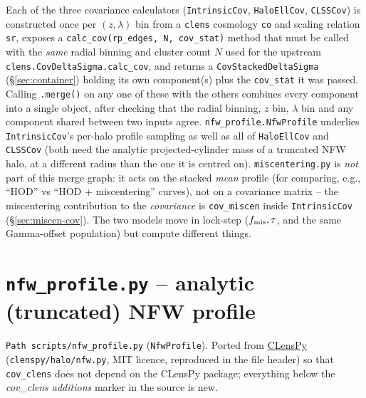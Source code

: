 \documentclass[a4paper, 11pt]{article}
\newcommand{\modname}[1]{\textcolor{kwcol}{\texttt{#1}}}
\newcommand{\blk}[1]{\textcolor{datablockcol}{\texttt{#1}}}
\newcommand{\pyfile}[1]{{\small\texttt{#1}}}
\begin{document}
Each of the three covariance calculators (\modname{IntrinsicCov},
\modname{HaloEllCov}, \modname{CLSSCov}) is constructed once per
$(z,\lambda)$ bin from a \modname{clens} cosmology \blk{co} and scaling
relation \blk{sr}, exposes a \texttt{calc\_cov(rp\_edges, N, cov\_stat)}
method that must be called with the \emph{same} radial binning and
cluster count $N$ used for the upstream
\texttt{clens.CovDeltaSigma.calc\_cov}, and returns a
\modname{CovStackedDeltaSigma} (\S\ref{sec:container}) holding its own
component(s) plus the \texttt{cov\_stat} it was passed. Calling
\texttt{.merge()} on any one of these with the others combines every
component into a single object, after checking that the radial
binning, $z$ bin, $\lambda$ bin and any component shared between two
inputs agree. \modname{nfw\_profile.NfwProfile} underlies
\modname{IntrinsicCov}'s per-halo profile sampling as well as all of
\modname{HaloEllCov} and \modname{CLSSCov} (both need the analytic
projected-cylinder mass of a truncated NFW halo, at a different
radius than the one it is centred on). \modname{miscentering.py} is
\emph{not} part of this merge graph: it acts on the stacked
\emph{mean} profile (for comparing, e.g., ``HOD'' vs ``HOD +
miscentering'' curves), not on a covariance matrix -- the miscentering
contribution to the \emph{covariance} is \texttt{cov\_miscen} inside
\modname{IntrinsicCov} (\S\ref{sec:miscen-cov}). The two models move
in lock-step ($f_{\rm mis}, \tau$, and the same Gamma-offset
population) but compute different things.

\section{\pyfile{nfw\_profile.py} -- analytic (truncated) NFW profile}
\label{sec:nfw}

\modname{Path}\ \pyfile{scripts/nfw\_profile.py} (\texttt{NfwProfile}).
Ported from
\href{https://github.com/estevesjh/CLensPy}{CLensPy} (\texttt{clenspy/halo/nfw.py},
MIT licence, reproduced in the file header) so that \modname{cov\_clens}
does not depend on the CLensPy package; everything below the
\emph{cov\_clens additions} marker in the source is new.
\end{document}
